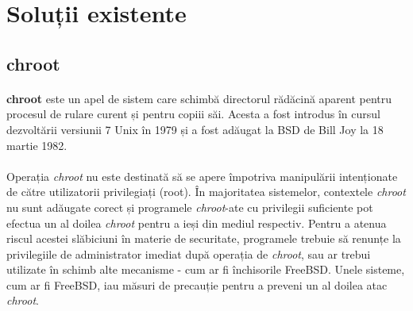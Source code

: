 

\section{Soluții existente}
    \subsection{chroot}
        \paragraph{} \textbf{chroot} este un apel de sistem care schimbă directorul rădăcină aparent pentru procesul de rulare curent și pentru copiii săi. Acesta a fost introdus în cursul dezvoltării versiunii 7 Unix în 1979 și a fost adăugat la BSD de Bill Joy la 18 martie 1982. \cite{kamp2000jails}
        \paragraph{} Operația \textit{chroot} nu este destinată să se apere împotriva manipulării intenționate de către utilizatorii privilegiați (root). În majoritatea sistemelor, contextele \textit{chroot} nu sunt adăugate corect și programele \textit{chroot}-ate cu privilegii suficiente pot efectua un al doilea \textit{chroot} pentru a ieși din mediul respectiv. Pentru a atenua riscul acestei slăbiciuni în materie de securitate, programele trebuie să renunțe la privilegiile de administrator imediat după operația de \textit{chroot}, sau ar trebui utilizate în schimb alte mecanisme - cum ar fi închisorile FreeBSD. Unele sisteme, cum ar fi FreeBSD, iau măsuri de precauție pentru a preveni un al doilea atac \textit{chroot}. \cite{freebsd:chroot}

